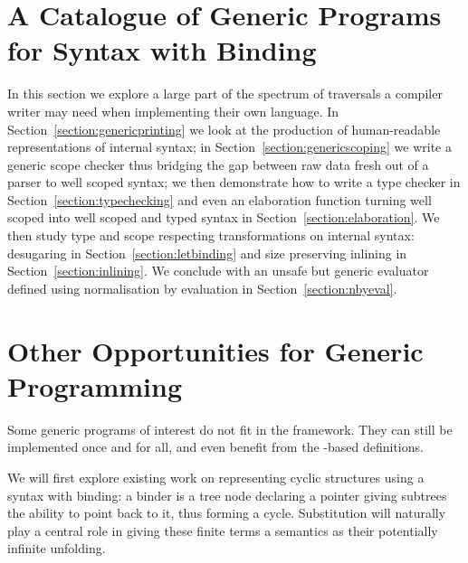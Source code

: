 
\section{A Catalogue of Generic Programs for Syntax with Binding}
\label{section:catalogue}

In this section we explore a large part of the spectrum of traversals a
compiler writer may need when implementing their own language.
In Section~\ref{section:genericprinting} we look at the production of
human-readable representations of internal syntax; in Section~\ref{section:genericscoping}
we write a generic scope checker thus bridging the gap between raw data
fresh out of a parser to well scoped syntax; we then demonstrate how to
write a type checker in Section~\ref{section:typechecking} and even an
elaboration function turning well scoped into well scoped and typed syntax
in Section~\ref{section:elaboration}. We then study type and scope respecting
transformations on internal syntax: desugaring in Section~\ref{section:letbinding}
and size preserving inlining in Section~\ref{section:inlining}. We conclude
with an unsafe but generic evaluator defined using normalisation by evaluation
in Section~\ref{section:nbyeval}.











\section{Other Opportunities for Generic Programming}

Some generic programs of interest do not fit in the 
framework. They can still be implemented once and for all, and even
benefit from the -based definitions.

We will first explore existing work on representing cyclic structures
using a syntax with binding: a binder is a tree node declaring a pointer
giving subtrees the ability to point back to it, thus forming a cycle.
Substitution will naturally play a central role in giving these finite
terms a semantics as their potentially infinite unfolding.

